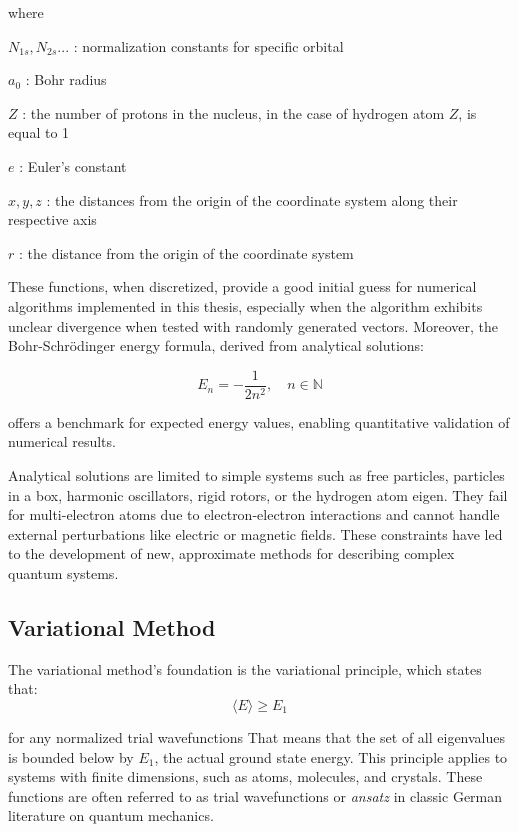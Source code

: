 \noindent where

\(N_{1s}, N_{2s}... \) : normalization constants for specific orbital

\(a_0 \) : Bohr radius

\(Z \) : the number of protons in the nucleus, in the case of hydrogen atom $Z$, is equal to 1

\(e \) : Euler's constant

\(x,y,z \) : the distances from the origin of the coordinate system along their respective axis

\(r \) : the distance from the origin of the coordinate system

These functions, when discretized, provide a good initial guess for numerical algorithms implemented in this thesis, especially when the algorithm exhibits unclear divergence when tested with randomly generated vectors. Moreover, the Bohr-Schrödinger energy formula, derived from analytical solutions:

\begin{equation}
	E_n = -\frac{1}{2n^2}, \quad n \in \mathbb{N}
\end{equation}

\noindent offers a benchmark for expected energy values, enabling quantitative validation of numerical results.

Analytical solutions are limited to simple systems such as free particles, particles in a box, harmonic oscillators, rigid rotors, or the hydrogen atom eigen. They fail for multi-electron atoms due to electron-electron interactions and cannot handle external perturbations like electric or magnetic fields. These constraints have led to the development of new, approximate methods for describing complex quantum systems.

\subsection{Variational Method}
The variational method's foundation is the variational principle, which states that:
\begin{equation}
	\langle E \rangle \geqslant E_1
\end{equation}

\noindent for any normalized trial wavefunctions That means that the set of all eigenvalues is bounded below by $E_1$, the actual ground state energy. This principle applies to systems with finite dimensions, such as atoms, molecules, and crystals. These functions are often referred to as trial wavefunctions or \textit{ansatz} in classic German literature on quantum mechanics.

